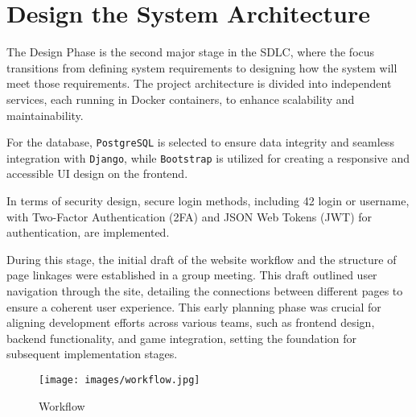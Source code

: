 \section{Design the System Architecture}
The Design Phase is the second major stage in the SDLC, where the focus transitions from defining system requirements to designing how the system will meet those requirements. The project architecture is divided into independent services, each running in Docker containers, to enhance scalability and maintainability.

For the database, \texttt{PostgreSQL} is selected to ensure data integrity and seamless integration with \texttt{Django}, while \texttt{Bootstrap} is utilized for creating a responsive and accessible UI design on the frontend.

In terms of security design, secure login methods, including 42 login or username, with Two-Factor Authentication (2FA) and JSON Web Tokens (JWT) for authentication, are implemented.

During this stage, the initial draft of the website workflow and the structure of page linkages were established in a group meeting. This draft outlined user navigation through the site, detailing the connections between different pages to ensure a coherent user experience. This early planning phase was crucial for aligning development efforts across various teams, such as frontend design, backend functionality, and game integration, setting the foundation for subsequent implementation stages.

\begin{figure}[H]
    \texttt{[image: images/workflow.jpg]}
    \caption{ Workflow }
    \label{fig:workflow}
\end{figure}


